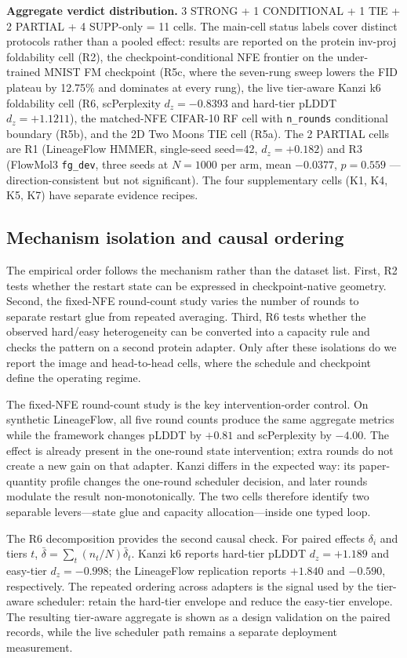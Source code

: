 \documentclass[journal,twocolumn,final]{IEEEtran}
\begin{document}
\textbf{Aggregate verdict distribution.} 3 STRONG + 1 CONDITIONAL + 1 TIE + 2 PARTIAL + 4 SUPP-only = 11 cells. The main-cell status labels cover distinct protocols rather than a pooled effect: results are reported on the protein inv-proj foldability cell (R2), the checkpoint-conditional NFE frontier on the under-trained MNIST FM checkpoint (R5c, where the seven-rung sweep lowers the FID plateau by 12.75\% and dominates at every rung), the live tier-aware Kanzi k6 foldability cell (R6, scPerplexity $d_z=-0.8393$ and hard-tier pLDDT $d_z=+1.1211$), the matched-NFE CIFAR-10 RF cell with \texttt{n\_rounds} conditional boundary (R5b), and the 2D Two Moons TIE cell (R5a). The 2 PARTIAL cells are R1 (LineageFlow HMMER, single-seed seed=42, $d_z=+0.182$) and R3 (FlowMol3 \texttt{fg\_dev}, three seeds at $N=1000$ per arm, mean $-0.0377$, $p=0.559$ --- direction-consistent but not significant). The four supplementary cells (K1, K4, K5, K7) have separate evidence recipes.

\subsection{Mechanism isolation and causal ordering}
The empirical order follows the mechanism rather than the dataset list. First, R2 tests whether the restart state can be expressed in checkpoint-native geometry. Second, the fixed-NFE round-count study varies the number of rounds to separate restart glue from repeated averaging. Third, R6 tests whether the observed hard/easy heterogeneity can be converted into a capacity rule and checks the pattern on a second protein adapter. Only after these isolations do we report the image and head-to-head cells, where the schedule and checkpoint define the operating regime.

The fixed-NFE round-count study is the key intervention-order control. On synthetic LineageFlow, all five round counts produce the same aggregate metrics while the framework changes pLDDT by $+0.81$ and scPerplexity by $-4.00$. The effect is already present in the one-round state intervention; extra rounds do not create a new gain on that adapter. Kanzi differs in the expected way: its paper-quantity profile changes the one-round scheduler decision, and later rounds modulate the result non-monotonically. The two cells therefore identify two separable levers---state glue and capacity allocation---inside one typed loop.

The R6 decomposition provides the second causal check. For paired effects $\delta_i$ and tiers $t$, $\bar{\delta}=\sum_t(n_t/N)\bar{\delta}_t$. Kanzi k6 reports hard-tier pLDDT $d_z=+1.189$ and easy-tier $d_z=-0.998$; the LineageFlow replication reports $+1.840$ and $-0.590$, respectively. The repeated ordering across adapters is the signal used by the tier-aware scheduler: retain the hard-tier envelope and reduce the easy-tier envelope. The resulting tier-aware aggregate is shown as a design validation on the paired records, while the live scheduler path remains a separate deployment measurement.
\end{document}
